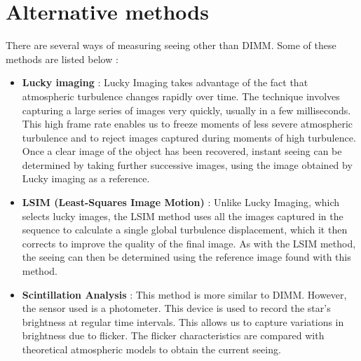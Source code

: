 \section{Alternative methods}
There are several ways of measuring seeing other than DIMM. Some of these methods are listed below :
\begin{itemize}
    \item \textbf{Lucky imaging} : Lucky Imaging takes advantage of the fact that atmospheric turbulence changes 
    rapidly over time. The technique involves capturing a large series of images very quickly, 
    usually in a few milliseconds. This high frame rate enables us to freeze moments of less severe atmospheric 
    turbulence and to reject images captured during moments of high turbulence. Once a clear image of the object 
    has been recovered, instant seeing can be determined by taking further successive images, using the image 
    obtained by Lucky imaging as a reference.
    \item \textbf{LSIM (Least-Squares Image Motion)} : Unlike Lucky Imaging, which selects lucky images, the LSIM 
    method uses all the images captured in the sequence to calculate a single global turbulence displacement, 
    which it then corrects to improve the quality of the final image. As with the LSIM method, the seeing can then 
    be determined using the reference image found with this method.
    \item \textbf{Scintillation Analysis} : This method is more similar to DIMM. However, the sensor used is a photometer. 
    This device is used to record the star's brightness at regular time intervals. This allows us to capture variations 
    in brightness due to flicker. The flicker characteristics are compared with theoretical atmospheric models 
    to obtain the current seeing.
\end{itemize}